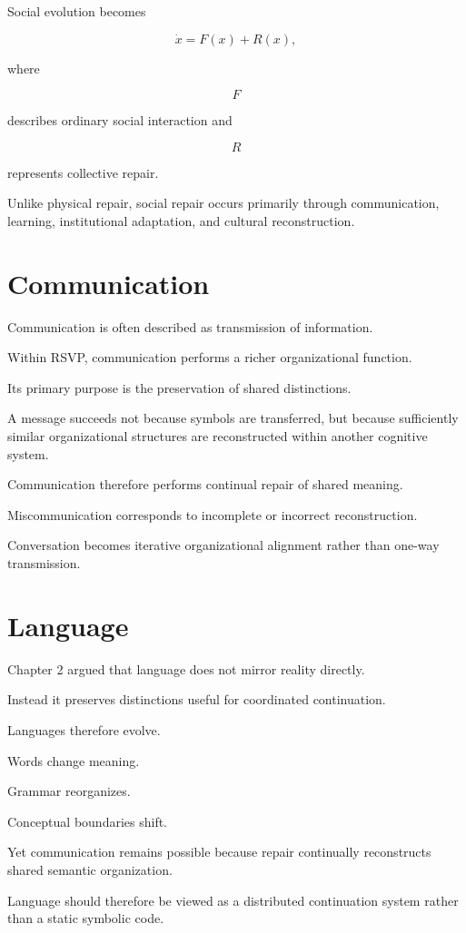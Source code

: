 \documentclass[11pt,oneside]{book}
\numberwithin{equation}{chapter}
\theoremstyle{definition}
\theoremstyle{plain}
\begin{document}
Social evolution becomes

\[
\dot x
=
F(x)
+
R(x),
\]

where

\[
F
\]

describes ordinary social interaction and

\[
R
\]

represents collective repair.

Unlike physical repair, social repair occurs primarily through
communication, learning, institutional adaptation, and cultural
reconstruction.

\section{Communication}

Communication is often described as transmission of information.

Within RSVP, communication performs a richer organizational function.

Its primary purpose is the preservation of shared distinctions.

A message succeeds not because symbols are transferred, but because
sufficiently similar organizational structures are reconstructed within
another cognitive system.

Communication therefore performs continual repair of shared meaning.

Miscommunication corresponds to incomplete or incorrect reconstruction.

Conversation becomes iterative organizational alignment rather than one-way
transmission.

\section{Language}

Chapter 2 argued that language does not mirror reality directly.

Instead it preserves distinctions useful for coordinated continuation.

Languages therefore evolve.

Words change meaning.

Grammar reorganizes.

Conceptual boundaries shift.

Yet communication remains possible because repair continually reconstructs
shared semantic organization.

Language should therefore be viewed as a distributed continuation system
rather than a static symbolic code.
\end{document}
